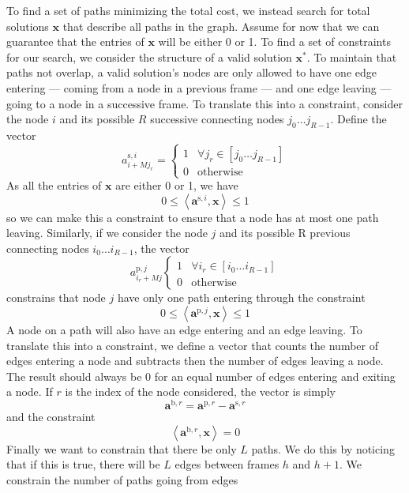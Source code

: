 To find a set of paths minimizing the total cost, we instead search for total
solutions $\boldsymbol{x}$ that describe all paths in the graph. Assume for now
that we can guarantee that the entries of $\boldsymbol{x}$ will be either 0 or
1. To find a set of constraints for our search, we consider the structure of a
valid solution $\boldsymbol{x}^{\ast}$. To maintain that paths not overlap, a
valid solution's nodes are only allowed to have one edge entering ---
coming from a node in a previous frame --- and one edge leaving
--- going to a node in a successive frame. To translate this into a
constraint, consider the node $i$ and its possible $R$ successive connecting
nodes $j_{0} \dotsc j_{R-1}$. Define the vector
\[
    a^{\text{s},i}_{i + Mj_{r}} = \begin{cases}
        1 & \forall j_{r} \in \left[ j_{0} \dotsc j_{R-1} \right] \\
        0 & \text{otherwise}
    \end{cases}
\]
As all the entries of $\boldsymbol{x}$ are either 0 or 1, we have
\[
    0 \leq \left\langle \boldsymbol{a}^{\text{s},i}, \boldsymbol{x} \right\rangle \leq 1
\]
so we can make this a constraint to ensure that a node has at most one path
leaving. Similarly, if we consider the node $j$ and its possible R previous connecting
nodes $i_{0} \dotsc i_{R-1}$, the vector
\[
    a^{\text{p},j}_{i_{r} + Mj} \begin{cases}
        1 & \forall i_{r} \in \left[ i_{0} \dotsc i_{R-1} \right] \\
        0 & \text{otherwise}
    \end{cases}
\]
constrains that node $j$ have only one path entering through the constraint
\[
    0 \leq \left\langle \boldsymbol{a}^{\text{p},j} , \boldsymbol{x} \right\rangle \leq 1
\]
A node on a path will also have an edge entering and an edge leaving. To
translate this into a constraint, we define a vector that counts the number of
edges entering a node and subtracts then the number of edges leaving a node. The
result should always be 0 for an equal number of edges entering and exiting a
node. If $r$ is the index of the node considered, the vector is simply
\[
    \boldsymbol{a}^{\text{b},r} = \boldsymbol{a}^{\text{p},r} -
    \boldsymbol{a}^{\text{s},r}
\]
and the constraint
\[
    \left\langle \boldsymbol{a}^{\text{b},r}, \boldsymbol{x} \right\rangle = 0
\]
Finally we want to constrain that there be only $L$ paths. We do this by
noticing that if this is true, there will be $L$ edges between frames $h$ and
$h+1$. We constrain the number of paths going from edges
